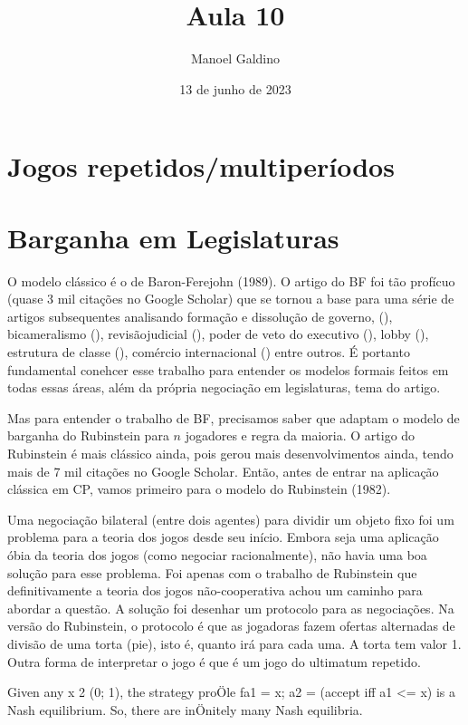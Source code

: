 \documentclass[
]{article}
\title{Aula 10}
\author{Manoel Galdino}
\date{13 de junho de 2023}
\begin{document}
\maketitle

\hypertarget{jogos-repetidosmultiperuxedodos}{%
\section{Jogos
repetidos/multiperíodos}\label{jogos-repetidosmultiperuxedodos}}

\hypertarget{barganha-em-legislaturas}{%
\section{Barganha em Legislaturas}\label{barganha-em-legislaturas}}

O modelo clássico é o de Baron-Ferejohn (1989). O artigo do BF foi tão
profícuo (quase 3 mil citações no Google Scholar) que se tornou a base
para uma série de artigos subsequentes analisando formação e dissolução
de governo, (), bicameralismo (), revisãojudicial (), poder de veto do
executivo (), lobby (), estrutura de classe (), comércio internacional
() entre outros. É portanto fundamental conehcer esse trabalho para
entender os modelos formais feitos em todas essas áreas, além da própria
negociação em legislaturas, tema do artigo.

Mas para entender o trabalho de BF, precisamos saber que adaptam o
modelo de barganha do Rubinstein para \(n\) jogadores e regra da
maioria. O artigo do Rubinstein é mais clássico ainda, pois gerou mais
desenvolvimentos ainda, tendo mais de 7 mil citações no Google Scholar.
Então, antes de entrar na aplicação clássica em CP, vamos primeiro para
o modelo do Rubinstein (1982).

Uma negociação bilateral (entre dois agentes) para dividir um objeto
fixo foi um problema para a teoria dos jogos desde seu início. Embora
seja uma aplicação óbia da teoria dos jogos (como negociar
racionalmente), não havia uma boa solução para esse problema. Foi apenas
com o trabalho de Rubinstein que definitivamente a teoria dos jogos
não-cooperativa achou um caminho para abordar a questão. A solução foi
desenhar um protocolo para as negociações. Na versão do Rubinstein, o
protocolo é que as jogadoras fazem ofertas alternadas de divisão de uma
torta (pie), isto é, quanto irá para cada uma. A torta tem valor 1.
Outra forma de interpretar o jogo é que é um jogo do ultimatum repetido.

Given any x 2 (0; 1), the strategy proÖle fa1 = x; a2 = (accept iff a1
\textless= x) is a Nash equilibrium. So, there are inÖnitely many Nash
equilibria.
\end{document}
